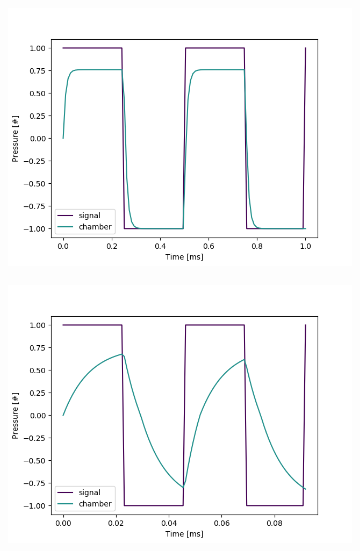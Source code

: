 \documentclass[fontsize=12pt, a4paper]{scrartcl}
\begin{document}
\begin{figure}[H]
    \centering
    \begin{subfigure}[H]{0.48\textwidth}
        \includegraphics[width=\textwidth, valign=t]{bilder/frequency/frequency_default_2kHz.png}
        \label{fig:frequency_normal}
    \end{subfigure}
    \begin{subfigure}[H]{0.48\textwidth}
        \includegraphics[width=\textwidth, valign=t]{bilder/frequency/frequency_to_fast_21_8 khz.png}
        \label{fig:frequency_fast}
    \end{subfigure}
    \begin{subfigure}[H]{0.48\textwidth}

\end{subfigure}
\end{figure}
\end{document}

